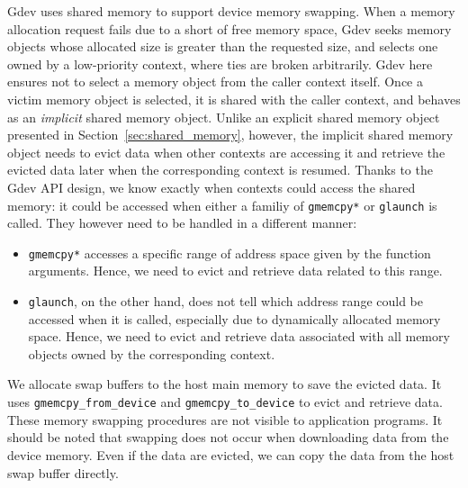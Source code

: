 Gdev uses shared memory to support device memory swapping.
When a memory allocation request fails due to a short of free memory
space, Gdev seeks memory objects whose allocated size is greater than
the requested size, and selects one owned by a low-priority context,
where ties are broken arbitrarily.
Gdev here ensures not to select a memory object from the caller context
itself.
Once a victim memory object is selected, it is shared with the caller
context, and behaves as an \textit{implicit} shared memory object.
Unlike an explicit shared memory object presented in
Section~\ref{sec:shared_memory}, however, the implicit shared memory
object needs to evict data when other contexts are accessing it and
retrieve the evicted data later when the corresponding context is
resumed.
Thanks to the Gdev API design, we know exactly when contexts could
access the shared memory: it could be accessed when either a familiy of
\texttt{gmemcpy*} or \texttt{glaunch} is called.
They however need to be handled in a different manner:
\begin{itemize}
 \vspace{-0.25em}
 \item \texttt{gmemcpy*} accesses a specific range of address space
       given by the function arguments.
       Hence, we need to evict and retrieve data related to this range.
 \vspace{-0.5em}
 \item \texttt{glaunch}, on the other hand, does not tell which address
       range could be accessed when it is called, especially due to
       dynamically allocated memory space.
       Hence, we need to evict and retrieve data associated with all
       memory objects owned by the corresponding context.
 \vspace{-0.25em}
\end{itemize}

We allocate swap buffers to the host main memory to save the evicted
data.
It uses \texttt{gmemcpy\_from\_device} and \texttt{gmemcpy\_to\_device}
to evict and retrieve data.
These memory swapping procedures are not visible to application programs.
It should be noted that swapping does not occur when downloading data
from the device memory.
Even if the data are evicted, we can copy the data from the host swap
buffer directly.

